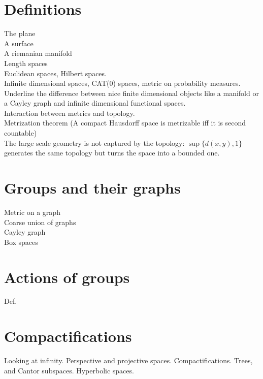 \section{Definitions}

The plane\\
A surface\\
A riemanian manifold\\
Length spaces\\

Euclidean spaces, Hilbert spaces.\\
Infinite dimensional spaces, CAT(0) spaces, metric on probability measures.\\

Underline the difference between nice finite dimensional objects like a manifold or a Cayley graph and infinite dimensional functional spaces.\\

Interaction between metrics and topology.\\

Metrization theorem (A compact Hausdorff space is metrizable iff it is second countable)\\

The large scale geometry is not captured by the topology: $\sup \{ d(x,y) , 1\}$ generates the same topology but turns the space into a bounded one.

\section{Groups and their graphs}

Metric on a graph \\
Coarse union of graphs\\

Cayley graph\\
Box spaces

\section{Actions of groups}

Def.

\section{Compactifications}
 
Looking at infinity. Perspective and projective spaces. Compactifications. Trees, and Cantor subspaces. Hyperbolic spaces.
 
